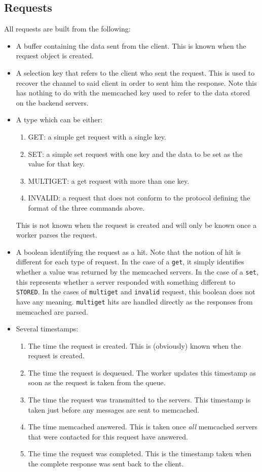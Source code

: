 \documentclass[11pt,a4paper]{article}
\begin{document}
\subsection{Requests}
All requests are built from the following:
\begin{itemize}
    \item A buffer containing the data sent from the client. This is known when the request object is created.
    \item A selection key that refers to the client who sent the request. This is used to recover the channel to said client in order to sent him the response. Note this has nothing to do with the memcached key used to refer to the data stored on the backend servers.
    \item A type which can be either:
    \begin{enumerate}
        \item GET: a simple get request with a single key.
        \item SET: a simple set request with one key and the data to be set as the value for that key.
        \item MULTIGET: a get request with more than one key.
        \item INVALID: a request that does not conform to the protocol defining the format of the three commands above.
    \end{enumerate}
    This is not known when the request is created and will only be known once a worker parses the request.
    \item A boolean identifying the request as a hit. Note that the notion of hit is different for each type of request. In the case of a \texttt{get}, it simply identifies whether a value was returned by the memcached servers. In the case of a \texttt{set}, this represents whether a server responded with something different to \texttt{STORED}. In the cases of \texttt{multiget} and \texttt{invalid} request, this boolean does not have any meaning. \texttt{multiget} hits are handled directly as the responses from memcached are parsed.
    \item Several timestamps:
    \begin{enumerate}
        \item The time the request is created. This is (obviously) known when the request is created.
        \item The time the request is dequeued. The worker updates this timestamp as soon as the request is taken from the queue.
        \item The time the request was transmitted to the servers. This timestamp is taken just before any messages are sent to memcached.
        \item The time memcached answered. This is taken once \textit{all} memcached servers that were contacted for this request have answered.
        \item The time the request was completed. This is the timestamp taken when the complete response was sent back to the client.
    \end{enumerate}
\end{itemize}
\end{document}
